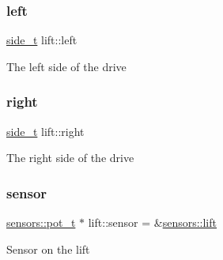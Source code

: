\subsubsection{\texorpdfstring{left}{left}}
{\footnotesize\ttfamily \hyperlink{structlift_1_1side__t}{side\+\_\+t} lift\+::left}

The left side of the drive \mbox{\label{namespacelift_a62e75ece6036a2e9ef8c6edf92d668a1}} 
\subsubsection{\texorpdfstring{right}{right}}
{\footnotesize\ttfamily \hyperlink{structlift_1_1side__t}{side\+\_\+t} lift\+::right}

The right side of the drive \mbox{\label{namespacelift_af71770a66903080ec69dfc131240e214}} 
\subsubsection{\texorpdfstring{sensor}{sensor}}
{\footnotesize\ttfamily \hyperlink{structsensors_1_1pot__t}{sensors\+::pot\+\_\+t} $\ast$ lift\+::sensor = \&\hyperlink{namespacesensors_a846dce2ebdbd35cd6abdbd3173dfb289}{sensors\+::lift}}

Sensor on the lift 